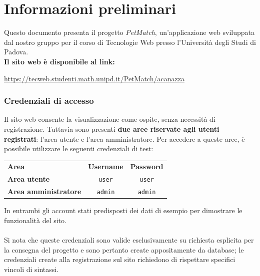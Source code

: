 \section*{Informazioni preliminari}
Questo documento presenta il progetto \textit{PetMatch}, un'applicazione web sviluppata dal nostro gruppo per il corso di Tecnologie Web presso l'Università degli Studi di Padova.\\
\textbf{Il sito web è disponibile al link:}
\begin{center}
\url{https://tecweb.studenti.math.unipd.it/PetMatch/acanazza}
\end{center}

\subsubsection*{Credenziali di accesso}
Il sito web consente la visualizzazione come ospite, senza necessità di registrazione. Tuttavia sono presenti \textbf{due aree riservate agli utenti registrati}: l'area utente e l'area amministratore. Per accedere a queste aree, è possibile utilizzare le seguenti credenziali di test:
\begin{center}
\begin{tabular}{|l|c|c|}
\hline
\rowcolor{brown}

\color{white}\textbf{Area} &
\color{white}\textbf{Username} &
\color{white}\textbf{Password} \\
\rowcolor{beige} 
\hline
\textbf{Area utente} & \texttt{user} & \texttt{user} \\
\rowcolor{beige} 
\hline
\textbf{Area amministratore} & \texttt{admin} & \texttt{admin} \\
\hline
\end{tabular}
\end{center}
In entrambi gli account stati predisposti dei dati di esempio per dimostrare le funzionalità del sito.\\\\
Si nota che queste credenziali sono valide esclusivamente su richiesta esplicita per la consegna del progetto e sono pertanto create appositamente da database; le credenziali create alla registrazione sul sito richiedono di rispettare specifici vincoli di sintassi.
